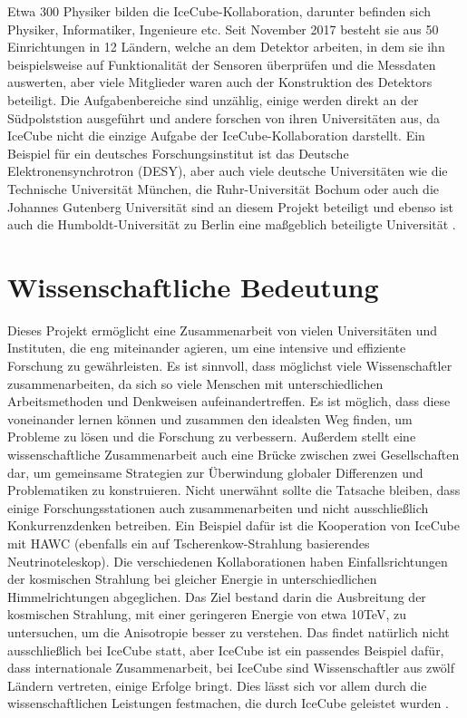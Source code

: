     Etwa 300 Physiker bilden die IceCube-Kollaboration, darunter befinden sich Physiker, 
    Informatiker, Ingenieure etc. Seit November 2017 besteht sie aus 50 Einrichtungen in 12 Ländern, 
    welche an dem Detektor arbeiten, in dem sie ihn beispielsweise auf Funktionalität der Sensoren 
    überprüfen und die Messdaten auswerten, aber viele Mitglieder waren auch der Konstruktion des Detektors 
    beteiligt. Die Aufgabenbereiche sind unzählig, einige werden direkt an der Südpolststion ausgeführt 
    und andere forschen von ihren Universitäten aus, da IceCube nicht die einzige Aufgabe der 
    IceCube-Kollaboration darstellt. Ein Beispiel für ein deutsches Forschungsinstitut ist das 
    \grqq Deutsche Elektronensynchrotron\grqq{} (DESY), aber auch viele deutsche Universitäten wie die Technische 
    Universität München, die Ruhr-Universität Bochum oder auch die Johannes Gutenberg Universität sind an 
    diesem Projekt beteiligt und ebenso ist auch die Humboldt-Universität zu Berlin eine maßgeblich beteiligte 
    Universität \cite{DeFor13} \cite{FAQ13}.

    \section{Wissenschaftliche Bedeutung}

    Dieses Projekt ermöglicht eine Zusammenarbeit von vielen Universitäten und Instituten, 
    die eng miteinander agieren, um eine intensive und effiziente Forschung zu gewährleisten. 
    Es ist sinnvoll, dass möglichst viele Wissenschaftler zusammenarbeiten, da sich so viele Menschen mit 
    unterschiedlichen Arbeitsmethoden und Denkweisen aufeinandertreffen. Es ist möglich, dass diese voneinander 
    lernen können und zusammen den idealsten Weg finden, um Probleme zu lösen und die Forschung zu verbessern. 
    Außerdem stellt eine wissenschaftliche Zusammenarbeit auch eine Brücke zwischen zwei Gesellschaften dar, 
    um gemeinsame Strategien zur Überwindung globaler Differenzen und Problematiken zu konstruieren. 
    Nicht unerwähnt sollte die Tatsache bleiben, dass einige Forschungsstationen auch zusammenarbeiten und 
    nicht ausschließlich Konkurrenzdenken betreiben. Ein Beispiel dafür ist die Kooperation von IceCube mit 
    HAWC (ebenfalls ein auf Tscherenkow-Strahlung basierendes Neutrinoteleskop). Die verschiedenen 
    Kollaborationen haben Einfallsrichtungen der kosmischen Strahlung bei gleicher Energie in 
    unterschiedlichen Himmelrichtungen abgeglichen. Das Ziel bestand darin die Ausbreitung der 
    kosmischen Strahlung, mit einer geringeren Energie von etwa 10TeV, zu untersuchen, um die 
    Anisotropie besser zu verstehen. Das findet natürlich nicht ausschließlich bei IceCube statt, 
    aber IceCube ist ein passendes Beispiel dafür, dass internationale Zusammenarbeit, bei IceCube 
    sind Wissenschaftler aus zwölf Ländern vertreten, einige Erfolge bringt. Dies lässt sich vor allem 
    durch die wissenschaftlichen Leistungen festmachen, die durch IceCube geleistet wurden \cite{DeFor13} \cite{IceHa18}.

